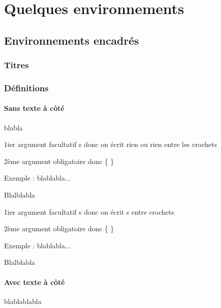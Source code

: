 \documentclass[french,10pt]{book}
\begin{document}
\pagestyle{fancy}
\fancyhf{} %

\setcounter{secnumdepth}{3} %
\setcounter{chapter}{1}%


\chapter{Quelques environnements}
\setcounter{minitocdepth}{3}    %
\minitoc\faketableofcontents

\section{Environnements encadrés}

\subsection{Titres}


\subsection{Définitions}


\subsubsection{Sans texte à côté}
blabla\par 
\begin{Defi} {}
1ier argument facultatif s donc on écrit rien ou rien entre les crochets\par
2ème argument obligatoire donc \{ \}
\end{Defi}

Exemple : blablabla...\par Blalblabla

\begin{Defi}[s]{}
1ier argument facultatif s donc on écrit s entre crochets \par
2ème argument obligatoire donc \{ \}
\end{Defi}
Exemple : blablabla...\par Blalblabla

\subsubsection{Avec texte à côté}
blablablabla\par 
\end{document}
